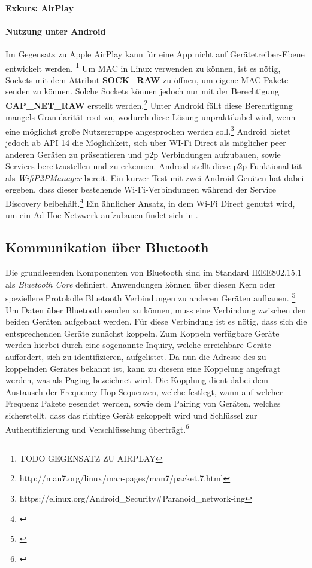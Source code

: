         \paragraph{Exkurs: AirPlay}

    
        \paragraph{Nutzung unter Android}
        Im Gegensatz zu Apple AirPlay kann für eine App nicht auf Gerätetreiber-Ebene entwickelt werden.  \footnote{TODO GEGENSATZ ZU AIRPLAY} 
        Um MAC in Linux verwenden zu können, ist es nötig, Sockets mit dem Attribut {\bf SOCK\_RAW} zu öffnen,
        um eigene MAC-Pakete senden zu können. Solche Sockets können jedoch nur mit der Berechtigung {\bf CAP\_NET\_RAW} erstellt werden.\footnote{http://man7.org/linux/man-pages/man7/packet.7.html}
        Unter Android fällt diese Berechtigung mangels Granularität root zu, wodurch diese Lösung unpraktikabel wird,
        wenn eine möglichst große Nutzergruppe angesprochen werden soll.\footnote{https://elinux.org/Android\_Security\#Paranoid\_network-ing}
        Android bietet jedoch ab API 14 die Möglichkeit, sich über WI-Fi Direct als möglicher peer anderen Geräten zu präsentieren und
        p2p Verbindungen aufzubauen, sowie Services bereitzustellen und zu erkennen.
        Android stellt diese p2p Funktionalität als {\it WifiP2PManager} bereit. Ein kurzer Test mit zwei Android Geräten hat dabei ergeben,
        dass dieser bestehende Wi-Fi-Verbindungen während der Service Discovery beibehält.\footnote{\cite{test-repository}}
        Ein ähnlicher Ansatz, in dem Wi-Fi Direct genutzt wird, um ein Ad Hoc Netzwerk aufzubauen findet sich in \cite{Aneja}.

    \subsection{Kommunikation über Bluetooth}
        Die grundlegenden Komponenten von Bluetooth sind im Standard IEEE802.15.1 als {\it Bluetooth Core} definiert. Anwendungen können über diesen Kern oder speziellere Protokolle Bluetooth
        Verbindungen zu anderen Geräten aufbauen. \footnote{\cite[S.228]{Lueders}} 
        Um Daten über Bluetooth senden zu können, muss eine Verbindung zwischen den beiden Geräten aufgebaut werden. Für diese Verbindung ist es nötig,
        dass sich die entsprechenden Geräte zunächst koppeln. Zum Koppeln verfügbare Geräte werden hierbei durch eine sogenannte Inquiry, welche erreichbare Geräte auffordert,
        sich zu identifizieren, aufgelistet. Da nun die Adresse des zu koppelnden Gerätes bekannt ist, kann zu diesem eine Koppelung angefragt werden, was als Paging bezeichnet wird.
        Die Kopplung dient dabei dem Austausch der Frequency Hop Sequenzen, welche festlegt, wann auf welcher Frequenz Pakete gesendet werden, sowie dem Pairing von Geräten, welches sicherstellt,
        dass das richtige Gerät gekoppelt wird und Schlüssel zur Authentifizierung und Verschlüsselung überträgt.\footnote{\cite[S.402f.]{Sauter}}

